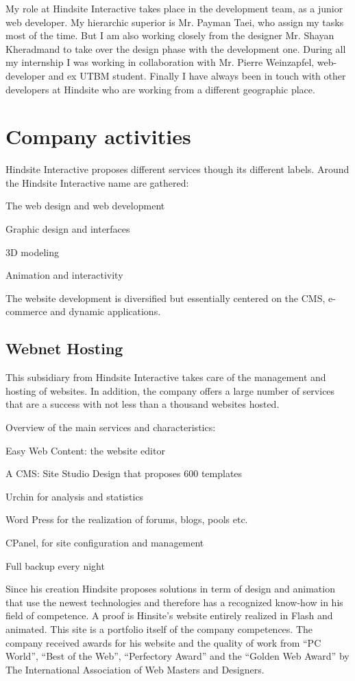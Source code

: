 My role at Hindsite Interactive takes place in the development team, as a
junior web developer. My hierarchic superior is Mr. Payman Taei, who assign
my tasks most of the time. But I am also working closely from the designer Mr.
Shayan Kheradmand to take over the design phase with the development one.
During all my internship I was working in collaboration with Mr. Pierre
Weinzapfel, web-developer and ex UTBM student.
Finally I have always been in touch with other developers at Hindsite who are
working from a different geographic place.

\section{Company activities}

Hindsite Interactive proposes different services though its different labels.
Around the Hindsite Interactive name are gathered:
\begin{itemize*}
\item The web design and web development
\item Graphic design and interfaces
\item 3D modeling
\item Animation and interactivity
\end{itemize*}
The website development is diversified but essentially centered on the CMS,
e-commerce and dynamic applications.

\subsection*{Webnet Hosting}

This subsidiary from Hindsite Interactive takes care of the management and
hosting of websites. In addition, the company offers a large number of
services that are a success with not less than a thousand websites hosted.

Overview of the main services and characteristics:
\begin{itemize*}
\item Easy Web Content: the website editor
\item A CMS: Site Studio Design that proposes 600 templates
\item Urchin for analysis and statistics
\item Word Press for the realization of forums, blogs, pools etc.
\item CPanel, for site configuration and management
\item Full backup every night
\end{itemize*}
Since his creation Hindsite proposes solutions in term of design and animation
that use the newest technologies and therefore has a recognized know-how in
his field of competence.
A proof is Hinsite’s website entirely realized in Flash and animated. This site is
a portfolio itself of the company competences.
The company received awards for his website and the quality of work from
“PC World”, “Best of the Web”, “Perfectory Award” and the “Golden Web
Award” by The International Association of Web Masters and Designers.

